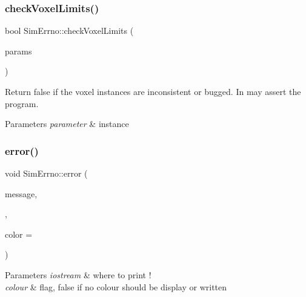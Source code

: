 \subsubsection{\texorpdfstring{check\+Voxel\+Limits()}{checkVoxelLimits()}}
{\footnotesize\ttfamily bool Sim\+Errno\+::check\+Voxel\+Limits (\begin{DoxyParamCaption}\item[{\hyperlink{class_parameters}{Parameters} \&}]{params }\end{DoxyParamCaption})\hspace{0.3cm}{\ttfamily [static]}}



Return false if the voxel instances are inconsistent or bugged. In may assert the program. 


\begin{DoxyParams}{Parameters}
{\em parameter} & instance \\
\hline
\end{DoxyParams}
\mbox{\label{class_sim_errno_a1d49dc3d396b355aee645c6d35436aa9}} 
\subsubsection{\texorpdfstring{error()}{error()}}
{\footnotesize\ttfamily void Sim\+Errno\+::error (\begin{DoxyParamCaption}\item[{std\+::string}]{message,  }\item[{std\+::ostream \&}]{,  }\item[{bool}]{color = {} }\end{DoxyParamCaption})\hspace{0.3cm}{\ttfamily [static]}}


\begin{DoxyParams}{Parameters}
{\em iostream} & where to print ! \\
\hline
{\em colour} & flag, false if no colour should be display or written \\
\hline
\end{DoxyParams}
\mbox{\label{class_sim_errno_a786ea76043026ad10aec48bc81137144}} 
